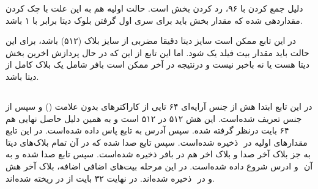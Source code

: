 دلیل جمع کردن  با ۹۶،‌ رد کردن بخش  است. حالت اولیه  هم به این علت با چک کردن  مقداردهی شده که مقدار بخش  باید برای سری اول گرفتن بلوک دیتا برابر با ۱ باشد. 

در این تابع ممکن است سایز دیتا دقیقا مضربی از سایز بلاک (۵۱۲) باشد،‌ برای این حالت باید مقدار بیت فیلد  یک شود. اما این تابع از این که در حال پردازش اخرین بخش دیتا هست یا نه باخبر نیست و درنتیجه در‌ آخر ممکن است بافر شامل یک بلاک کامل از دیتا باشد. 



\subsection{}
\label{subsec:skein-hash}

در این تابع ابتدا هش از جنس آرایه‌ای ۶۴ تایی از کاراکتر‌های بدون علامت () و سپس   از جنس \hyperref[subsec:sph-skein-big-context]{} تعریف شده‌است. این هش ۵۱۲ در ۵۱۲ است و به همین دلیل حاصل نهایی هم ۶۴ بایت درنظر گرفته شده. سپس آدرس  به تابع\hyperref[subsec:sph-skein512-init]{} پاس داده شده‌است. در این تابع مقدارهای اولیه در ‌ ذخیره شده‌است. سپس تایع \hyperref[subsec:sph-skein512]{} صدا شده که در آن تمام بلاک‌های دیتا به جز بلاک آخر صدا و بلاک ‌اخر هم در بافر ذخیره شده‌است. سپس تابع  \hyperref[subsec:sph-skein512-close]{} صدا شده و به آن ‌ و ادرس شروع  داده شده‌است. در این مرحله بیت‌های اضافی اضافه، بلاک ‌آخر هش و در ‌ ذخیره شده‌اند. 
در نهایت ۳۲ بایت از  در  ریخته شده‌اند.

\subsection{}
\label{subsec:sph-skein512-close}

